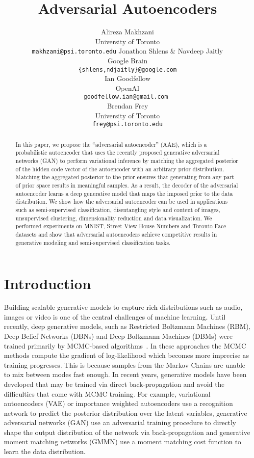 \documentclass{article}
\title{Adversarial Autoencoders}
\author{
Alireza Makhzani\\
University of Toronto\\
\texttt{makhzani@psi.toronto.edu}
\And
Jonathon Shlens \& Navdeep Jaitly \\
Google Brain \\
\texttt{\{shlens,ndjaitly\}@google.com} \\
\And
Ian Goodfellow \\
OpenAI \\
\texttt{goodfellow.ian@gmail.com } \\
\And
Brendan Frey\\
University of Toronto\\
\texttt{frey@psi.toronto.edu}
}
\begin{document}
\maketitle
\begin{abstract}
In this paper, we propose the ``adversarial autoencoder'' (AAE), which is a probabilistic autoencoder that uses the recently proposed generative adversarial networks (GAN) to perform variational inference by matching the aggregated posterior of the hidden code vector of the autoencoder with an arbitrary prior distribution. Matching the aggregated posterior to the prior ensures that generating from any part of prior space results in meaningful samples.  As a result, the decoder of the adversarial autoencoder learns a deep generative model that maps the imposed prior to the data distribution. We show how the adversarial autoencoder can be used in applications such as semi-supervised classification, disentangling style and content of images, unsupervised clustering, dimensionality reduction and data visualization. We performed experiments on MNIST, Street View House Numbers and Toronto Face datasets and show that adversarial autoencoders achieve competitive results in generative modeling and semi-supervised classification tasks.
\end{abstract}

\section{Introduction}
Building scalable generative models to capture rich distributions such as audio, images or video is one of the central challenges of machine learning.
Until recently, deep generative models, such as Restricted Boltzmann Machines (RBM), Deep Belief Networks (DBNs) and Deep Boltzmann Machines (DBMs) were
trained primarily by MCMC-based algorithms~\citep{geoff,russ}.
In these approaches the MCMC methods compute the gradient of log-likelihood which becomes more imprecise as training progresses. This is because
samples from the Markov Chains are unable to mix between modes fast enough.  In recent years, generative models have been developed that may be
trained via direct back-propagation and avoid the difficulties that come with MCMC training.
For example, variational autoencoders (VAE) \citep{vae,rezende} or importance weighted autoencoders \citep{yuri} use a recognition network to predict the posterior distribution over the latent variables, generative adversarial networks (GAN) \citep{gan} use an adversarial training procedure to directly shape the output distribution of the network via back-propagation and generative moment matching networks (GMMN) \citep{gmmn} use a moment matching cost function to learn the data distribution.
\end{document}
